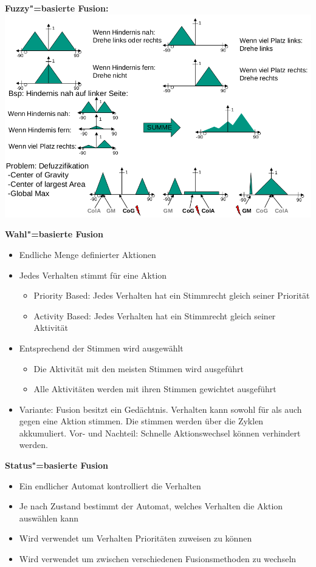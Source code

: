 \textbf{Fuzzy"=basierte Fusion:}\\
\includegraphics[width=.8\textwidth]{figures/fuzzy_based.png}

\textbf{Wahl"=basierte Fusion}
\begin{itemize}
	\item Endliche Menge definierter Aktionen
	\item Jedes Verhalten stimmt für eine Aktion
	\begin{itemize}
		\item Priority Based: Jedes Verhalten hat ein Stimmrecht gleich seiner Priorität
		\item Activity Based: Jedes Verhalten hat ein Stimmrecht gleich seiner Aktivität
	\end{itemize}
	\item Entsprechend der Stimmen wird ausgewählt
	\begin{itemize}
		\item Die Aktivität mit den meisten Stimmen wird ausgeführt
		\item Alle Aktivitäten werden mit ihren Stimmen gewichtet ausgeführt
	\end{itemize}
	\item Variante: Fusion besitzt ein Gedächtnis. Verhalten kann sowohl für als auch gegen eine Aktion stimmen. Die stimmen werden über die Zyklen akkumuliert. Vor- und Nachteil: Schnelle Aktionswechsel können verhindert werden.
\end{itemize}

\textbf{Status"=basierte Fusion}
\begin{itemize}
	\item Ein endlicher Automat kontrolliert die Verhalten
	\item Je nach Zustand bestimmt der Automat, welches Verhalten die Aktion auswählen kann
	\item Wird verwendet um Verhalten Prioritäten zuweisen zu können
	\item Wird verwendet um zwischen verschiedenen Fusionsmethoden zu wechseln
\end{itemize}

